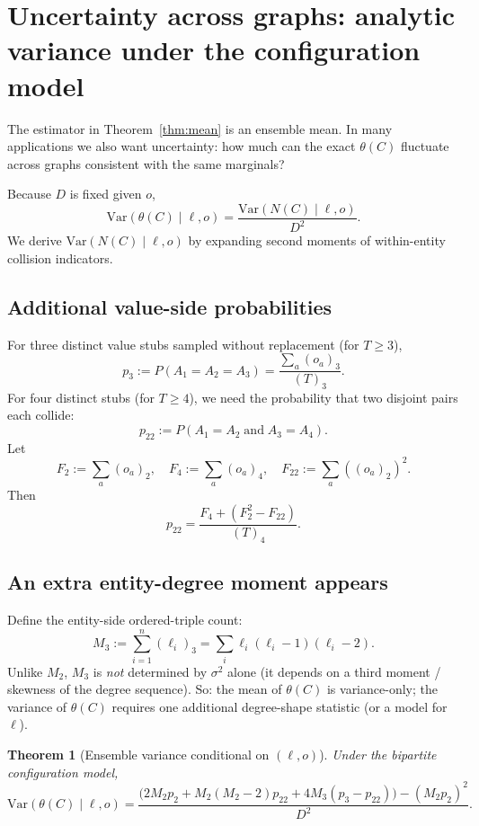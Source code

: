 \documentclass[11pt]{article}
\newcommand{\Var}{\mathrm{Var}}
\newcommand{\1}{\mathbf{1}}
\newcommand{\fall}[2]{\left(#1\right)_{#2}} %
\theoremstyle{plain}
\newtheorem{theorem}{Theorem}
\theoremstyle{definition}
\begin{document}
\section{Uncertainty across graphs: analytic variance under the configuration model}

The estimator in Theorem~\ref{thm:mean} is an ensemble mean.
In many applications we also want uncertainty: how much can the exact $\theta(C)$ fluctuate across graphs consistent with the same marginals?

Because $D$ is fixed given $o$,
\[
\Var(\theta(C)\mid \ell,o) = \frac{\Var(N(C)\mid \ell,o)}{D^2}.
\]
We derive $\Var(N(C)\mid \ell,o)$ by expanding second moments of within-entity collision indicators.

\subsection{Additional value-side probabilities}
For three distinct value stubs sampled without replacement (for $T\ge 3$),
\[
p_3 := P(A_1=A_2=A_3) = \frac{\sum_a \fall{o_a}{3}}{\fall{T}{3}}.
\]
For four distinct stubs (for $T\ge 4$), we need the probability that two disjoint pairs each collide:
\[
p_{22} := P(A_1=A_2 \;\text{and}\; A_3=A_4).
\]
Let
\[
F_2 := \sum_a \fall{o_a}{2},\quad
F_4 := \sum_a \fall{o_a}{4},\quad
F_{22} := \sum_a \left(\fall{o_a}{2}\right)^2.
\]
Then
\[
\boxed{
p_{22} = \frac{F_4 + (F_2^2 - F_{22})}{\fall{T}{4}}.
}
\]

\subsection{An extra entity-degree moment appears}
Define the entity-side ordered-triple count:
\[
M_3 := \sum_{i=1}^n \fall{\ell_i}{3} = \sum_i \ell_i(\ell_i-1)(\ell_i-2).
\]
Unlike $M_2$, $M_3$ is \emph{not} determined by $\sigma^2$ alone (it depends on a third moment / skewness of the degree sequence).
So: the mean of $\theta(C)$ is variance-only; the variance of $\theta(C)$ requires one additional degree-shape statistic (or a model for $\ell$).

\begin{theorem}[Ensemble variance conditional on $(\ell,o)$]
\label{thm:var}
\normalfont Under the bipartite configuration model,
\begin{equation*}
\boxed{
\Var(\theta(C)\mid \ell,o)
=
\frac{
\Big(2M_2 p_2 + M_2(M_2-2)p_{22} + 4M_3(p_3-p_{22})\Big)
-
(M_2 p_2)^2
}{D^2}.
}
\end{equation*}
\end{theorem}
\end{document}

